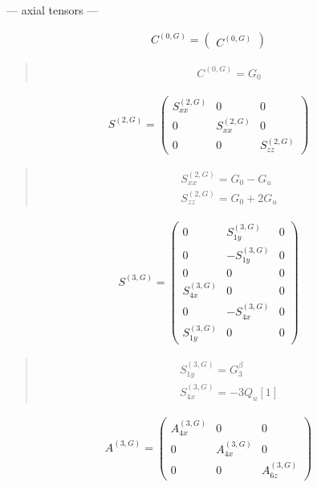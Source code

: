 \documentclass[fleqn,10pt]{jsarticle}
\begin{document}
\newpage
\begin{center}\LARGE --- axial tensors ---\end{center}
\begin{align*}
C^{(0,G)} = \begin{pmatrix} C^{(0,G)} \end{pmatrix}
\end{align*}
\begin{quote}
\begin{align*}
& C^{(0,G)} = G_{0}
\end{align*}
\end{quote}
\begin{align*}
S^{(2,G)} = \begin{pmatrix} S^{(2,G)}_{xx} & 0 & 0 \\ 0 & S^{(2,G)}_{xx} & 0 \\ 0 & 0 & S^{(2,G)}_{zz} \end{pmatrix}
\end{align*}
\begin{quote}
\begin{align*}
& S^{(2,G)}_{xx} = G_{0} - G_{u} \\
& S^{(2,G)}_{zz} = G_{0} + 2 G_{u}
\end{align*}
\end{quote}
\begin{align*}
S^{(3,G)} = \begin{pmatrix} 0 & S^{(3,G)}_{1y} & 0 \\ 0 & - S^{(3,G)}_{1y} & 0 \\ 0 & 0 & 0 \\ S^{(3,G)}_{4x} & 0 & 0 \\ 0 & - S^{(3,G)}_{4x} & 0 \\ S^{(3,G)}_{1y} & 0 & 0 \end{pmatrix}
\end{align*}
\begin{quote}
\begin{align*}
& S^{(3,G)}_{1y} = G_{3}^{\beta} \\
& S^{(3,G)}_{4x} = - 3 Q_{u}[1]
\end{align*}
\end{quote}
\begin{align*}
A^{(3,G)} = \begin{pmatrix} A^{(3,G)}_{4x} & 0 & 0 \\ 0 & A^{(3,G)}_{4x} & 0 \\ 0 & 0 & A^{(3,G)}_{6z} \end{pmatrix}
\end{align*}
\end{document}
